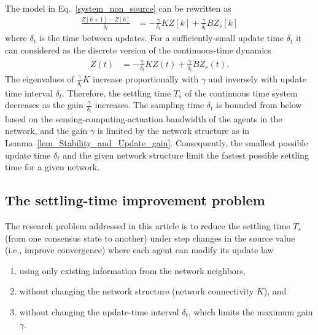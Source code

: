 \documentclass[conference]{IEEEtran}
\begin{document}
\vspace{0.1in}
The model in Eq.~\eqref{system_non_source}  can be rewritten as 
\begin{equation}
\begin{array}{rl}
\frac{Z[k+1]- Z[k]} {\delta_t} &  =   -\frac{\gamma}{\delta_t}  K Z[k] + \frac{\gamma}{\delta_t}  B  Z_s [k]
\end{array}
\end{equation}
where $\delta_t$ is the  time between updates. 
For a sufficiently-small update time $\delta_t$ it can 
considered as the discrete version of the continuous-time  dynamics 
\begin{equation}
\begin{array}{rl}
\dot{Z}(t) &  =   -\frac{\gamma}{\delta_t} K Z (t) + \frac{\gamma}{\delta_t}   B  Z_s (t).
\label{system_non_source_contnuous}
\end{array}
\end{equation}
The eigenvalues of $ \frac{\gamma}{\delta_t} K $  increase proportionally with $\gamma$ and inversely with update time interval $\delta_t$. Therefore, the settling time $T_s$ of the continuous time system decreases as the gain $\frac{\gamma}{\delta_t}$ increases. 
The sampling time $\delta_t$ is bounded from below based on the
 sensing-computing-actuation bandwidth of the agents in the network, and 
 the gain $\gamma$ is limited by the network structure as in Lemma~\ref{lem_Stability_and_Update_gain}. 
Consequently, the  smallest possible update time $\delta_t$ and the given network structure 
limit the fastest possible settling time for a given network. 


\subsection{The settling-time improvement problem}
\vspace{-0.01in}
The research problem addressed in this article is to   reduce the settling time $T_s$   (from one consensus state to another) 
under step changes in the source value (i.e., improve convergence) where each agent can modify  its update law 
\begin{enumerate}
\item 
using only existing information from the network neighbors, 
\item 
without changing the network structure (network connectivity $K$), and  
\item 
without changing the update-time interval $\delta_t$, which limits the maximum gain $\gamma$.
\end{enumerate}
\end{document}
